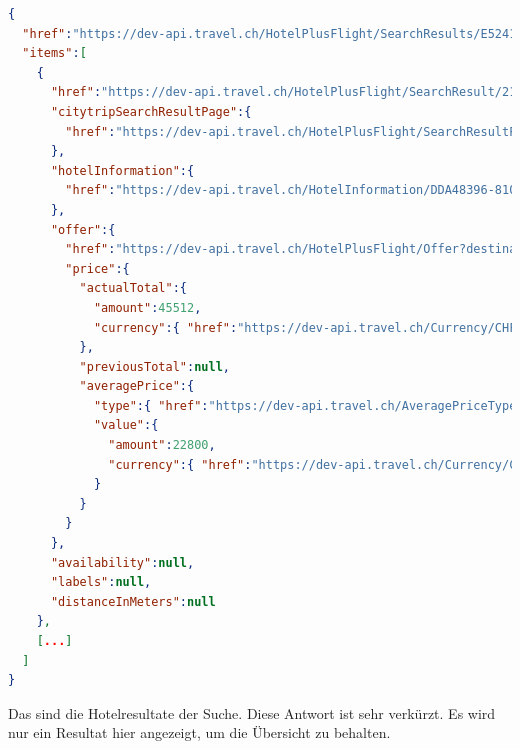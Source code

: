 \begin{lstlisting}[language=json,firstnumber=1]
{
  "href":"https://dev-api.travel.ch/HotelPlusFlight/SearchResults/E5241069-1272-4DD0-946E-46DD2E9D55E6",
  "items":[
    {
      "href":"https://dev-api.travel.ch/HotelPlusFlight/SearchResult/21ca65ff-976a-4a3e-bc92-b17608db3b25?pageId=58B8D81D-12B5-4EEE-9CE9-902CCDF01791",
      "citytripSearchResultPage":{
        "href":"https://dev-api.travel.ch/HotelPlusFlight/SearchResultPage/19E2B6BB-1F06-4396-B86E-169EDB368B0E?paging.offset=0&paging.size=12&sortMethod.type=https%3A%2F%2Fdev-api.travel.ch%2FSortType%2FPrice[...]"
      },
      "hotelInformation":{
        "href":"https://dev-api.travel.ch/HotelInformation/DDA48396-8105-433D-B75B-668F96EC89D8"
      },
      "offer":{
        "href":"https://dev-api.travel.ch/HotelPlusFlight/Offer?destination=https%3A%2F%2Fdev-api.travel.ch%2FDestination%2FH_63CA0931EAD8A33EF988144360A8056C&offerHotelInformation=https%3A%2F%2Fdev-api.travel.ch%2FHotelInformation%2FDDA48396-8105-433D-B75B-668F96EC89D8[...]",
        "price":{
          "actualTotal":{
            "amount":45512,
            "currency":{ "href":"https://dev-api.travel.ch/Currency/CHF" }
          },
          "previousTotal":null,
          "averagePrice":{
            "type":{ "href":"https://dev-api.travel.ch/AveragePriceType/PerPerson" },
            "value":{
              "amount":22800,
              "currency":{ "href":"https://dev-api.travel.ch/Currency/CHF" }
            }
          }
        }
      },
      "availability":null,
      "labels":null,
      "distanceInMeters":null
    },
    [...]
  ]
}
\end{lstlisting}
Das sind die Hotelresultate der Suche. Diese Antwort ist sehr verkürzt. Es wird nur ein Resultat hier angezeigt, um die Übersicht zu behalten.



